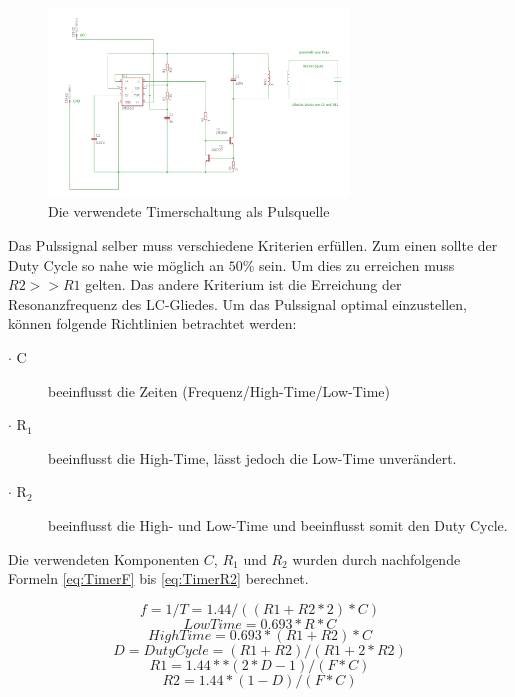 \begin{figure}[H]
	\begin{center}
		\includegraphics[width=80mm]{data/Tranceiver.png}
		\caption[Ne555]{Die verwendete Timerschaltung als Pulsquelle} %
		\label{fig:Tranceiver-Schaltung}
	\end{center}
\end{figure}
 
Das Pulssignal selber muss verschiedene Kriterien erfüllen. Zum einen sollte der Duty Cycle so nahe wie möglich an $50\%$ sein. Um dies zu erreichen muss $R2 >> R1$ gelten. Das andere Kriterium ist die Erreichung der Resonanzfrequenz des LC-Gliedes. Um das Pulssignal optimal einzustellen, können folgende Richtlinien betrachtet werden:
\begin{description}
	\item [$\cdot$ C] beeinflusst die Zeiten (Frequenz/High-Time/Low-Time)
	\item [$\cdot$ R$_{1}$] beeinflusst die High-Time, lässt jedoch die Low-Time unverändert.
	\item [$\cdot$ R$_{2}$ ] beeinflusst die High- und Low-Time und beeinflusst somit den Duty Cycle.
\end{description}

Die verwendeten Komponenten $C$, $R_{1}$ und $R_{2}$ wurden durch nachfolgende Formeln \ref{eq:TimerF} bis \ref{eq:TimerR2} berechnet. 

\begin{equation}\label{eq:Timerf}
f=1/T= 1.44/((R1+R2*2)*C)
\end{equation}
\begin{equation}\label{eq:TimerTL}
Low Time= 0.693*R*C
\end{equation}
\begin{equation}\label{eq:TimerTH}
High Time= 0.693*(R1+R2)*C
\end{equation}
\begin{equation}\label{eq:TimerDC}
D= Duty Cycle= (R1+R2)/(R1+2*R2)
\end{equation}
\begin{equation}\label{eq:TimerR1}
R1= 1.44**(2*D-1)/(F*C)
\end{equation}
\begin{equation}\label{eq:TimerR2}
R2= 1.44*(1-D)/(F*C)
\end{equation} 

